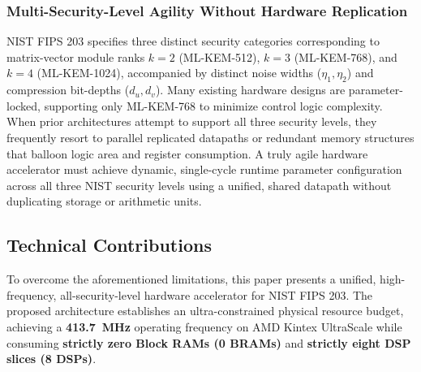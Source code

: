 \subsubsection{Multi-Security-Level Agility Without Hardware Replication}
NIST FIPS 203 specifies three distinct security categories corresponding to matrix-vector module ranks $k = 2$ (ML-KEM-512), $k = 3$ (ML-KEM-768), and $k = 4$ (ML-KEM-1024), accompanied by distinct noise widths ($\eta_1, \eta_2$) and compression bit-depths ($d_u, d_v$). Many existing hardware designs are parameter-locked, supporting only ML-KEM-768 to minimize control logic complexity. When prior architectures attempt to support all three security levels, they frequently resort to parallel replicated datapaths or redundant memory structures that balloon logic area and register consumption. A truly agile hardware accelerator must achieve dynamic, single-cycle runtime parameter configuration across all three NIST security levels using a unified, shared datapath without duplicating storage or arithmetic units.

\subsection{Technical Contributions}
\label{sec:intro_contributions}
To overcome the aforementioned limitations, this paper presents a unified, high-frequency, all-security-level hardware accelerator for NIST FIPS 203. The proposed architecture establishes an ultra-constrained physical resource budget, achieving a \textbf{413.7~MHz} operating frequency on AMD Kintex UltraScale while consuming \textbf{strictly zero Block RAMs (0 BRAMs)} and \textbf{strictly eight DSP slices (8 DSPs)}.

